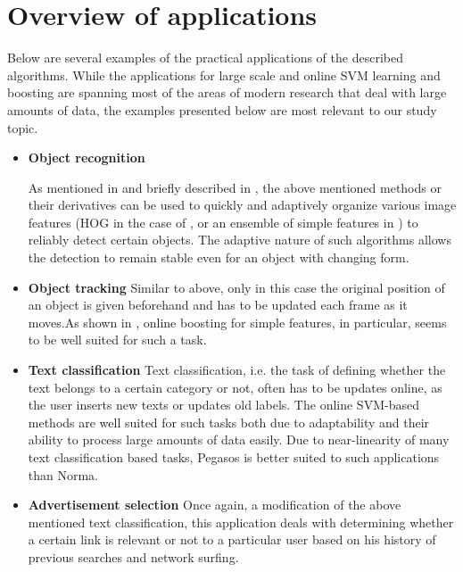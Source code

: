 \section {Overview of applications}
Below are several examples of the practical applications of the described algorithms. While the applications for large scale and online SVM learning and boosting are spanning most of the areas of modern research that deal with large amounts of data, the examples presented below are most relevant to our study topic. 
\begin{itemize}
\item {\bf Object recognition}

As mentioned in \cite{fast} and briefly described in \cite{viola}, the above mentioned methods or their derivatives can be used to quickly  and adaptively organize various image features (HOG in the case of  \cite{fast}, or an ensemble of simple features in  \cite{viola}) to reliably detect certain objects. The adaptive nature of such algorithms allows the detection to remain stable even for an object with changing form. 
\item {\bf Object tracking}
Similar to above, only in this case the original position of an object is given beforehand and has to be updated each frame as it moves.As shown in \cite{grabner2006}, online boosting for simple features, in particular, seems to be well suited for such a task.
\item {\bf Text classification}
Text classification, i.e. the task of defining whether the text belongs to a certain category or not, often has to be updates online, as the user inserts new texts or updates old labels. The online SVM-based methods are well suited for such tasks both due to adaptability and their ability to process large amounts of data easily. Due to near-linearity of many text classification based tasks, Pegasos is better suited to such applications than Norma.
\item {\bf Advertisement selection}
Once again, a modification of the above mentioned text classification, this application deals with determining whether a certain link is relevant or not to a particular user based on his history of previous searches and network surfing. 
\end{itemize}

